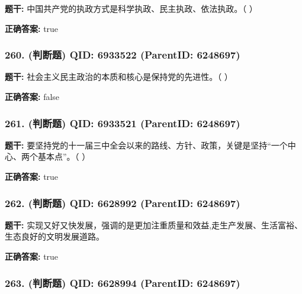 \documentclass[12pt,UTF8]{ctexart}
\begin{document}
\textbf{题干:}
中国共产党的执政方式是科学执政、民主执政、依法执政。（ ）



\textbf{正确答案:}
true

\vspace{0.3em}\hrulefill\vspace{0.7em}

\subsubsection*{260. (判断题) \small QID: 6933522 (ParentID: 6248697)}

\textbf{题干:}
社会主义民主政治的本质和核心是保持党的先进性。（ ）



\textbf{正确答案:}
false

\vspace{0.3em}\hrulefill\vspace{0.7em}

\subsubsection*{261. (判断题) \small QID: 6933521 (ParentID: 6248697)}

\textbf{题干:}
要坚持党的十一届三中全会以来的路线、方针、政策，关键是坚持“一个中心、两个基本点”。（ ）



\textbf{正确答案:}
true

\vspace{0.3em}\hrulefill\vspace{0.7em}

\subsubsection*{262. (判断题) \small QID: 6628992 (ParentID: 6248697)}

\textbf{题干:}
实现又好又快发展，强调的是更加注重质量和效益,走生产发展、生活富裕、生态良好的文明发展道路。



\textbf{正确答案:}
true

\vspace{0.3em}\hrulefill\vspace{0.7em}

\subsubsection*{263. (判断题) \small QID: 6628994 (ParentID: 6248697)}
\end{document}
